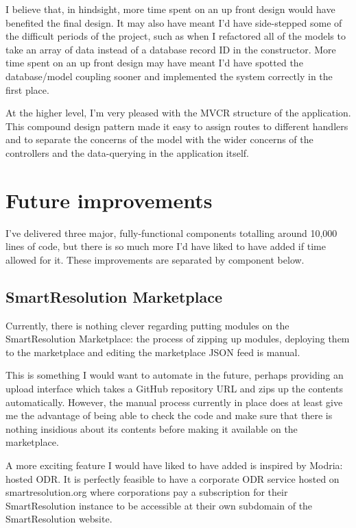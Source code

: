 I believe that, in hindsight, more time spent on an up front design would have benefited the final design. It may also have meant I'd have side-stepped some of the difficult periods of the project, such as when I refactored all of the models to take an array of data instead of a database record ID in the constructor. More time spent on an up front design may have meant I'd have spotted the database/model coupling sooner and implemented the system correctly in the first place.

At the higher level, I'm very pleased with the MVCR structure of the application. This compound design pattern made it easy to assign routes to different handlers and to separate the concerns of the model with the wider concerns of the controllers and the data-querying in the application itself.

\section{Future improvements}

I've delivered three major, fully-functional components totalling around 10,000 lines of code, but there is so much more I'd have liked to have added if time allowed for it. These improvements are separated by component below.

\subsection{SmartResolution Marketplace}

Currently, there is nothing clever regarding putting modules on the SmartResolution Marketplace: the process of zipping up modules, deploying them to the marketplace and editing the marketplace JSON feed is manual.

This is something I would want to automate in the future, perhaps providing an upload interface which takes a GitHub repository URL and zips up the contents automatically. However, the manual process currently in place does at least give me the advantage of being able to check the code and make sure that there is nothing insidious about its contents before making it available on the marketplace.

A more exciting feature I would have liked to have added is inspired by Modria: hosted ODR. It is perfectly feasible to have a corporate ODR service hosted on smartresolution.org where corporations pay a subscription for their SmartResolution instance to be accessible at their own subdomain of the SmartResolution website.


